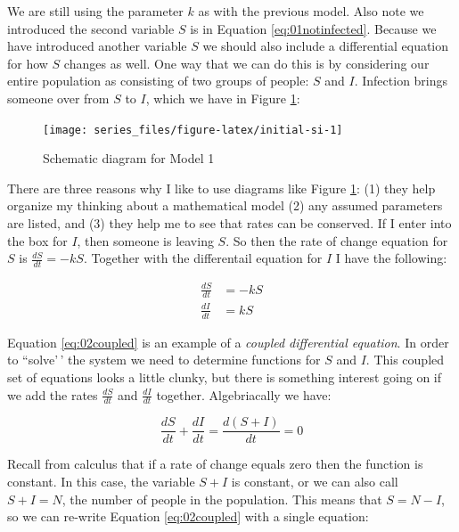 \documentclass[
]{book}
\theoremstyle{definition}
\theoremstyle{definition}
\theoremstyle{definition}
\theoremstyle{remark}
\begin{document}
We are still using the parameter \(k\) as with the previous model. Also note we introduced the second variable \(S\) is in Equation \eqref{eq:01notinfected}. Because we have introduced another variable \(S\) we should also include a differential equation for how \(S\) changes as well. One way that we can do this is by considering our entire population as consisting of two groups of people: \(S\) and \(I\). Infection brings someone over from \(S\) to \(I\), which we have in Figure \ref{fig:initial-si}:

\begin{figure}

{\centering \texttt{[image: series\_files/figure-latex/initial-si-1]} 

}

\caption{Schematic diagram for Model 1}\label{fig:initial-si}
\end{figure}

There are three reasons why I like to use diagrams like Figure \ref{fig:initial-si}: (1) they help organize my thinking about a mathematical model (2) any assumed parameters are listed, and (3) they help me to see that rates can be conserved. If I enter into the box for \(I\), then someone is leaving \(S\). So then the rate of change equation for \(S\) is \(\displaystyle \frac{dS}{dt} = -kS\). Together with the differentail equation for \(I\) I have the following:

\begin{equation}
\begin{split}
\frac{dS}{dt} &= -kS \\ 
\frac{dI}{dt} &= kS
\end{split}
\label{eq:02coupled}
\end{equation}

Equation \eqref{eq:02coupled} is an example of a \emph{coupled differential equation}. In order to ``solve'\,' the system we need to determine functions for \(S\) and \(I\). This coupled set of equations looks a little clunky, but there is something interest going on if we add the rates \(\displaystyle \frac{dS}{dt}\) and \(\displaystyle \frac{dI}{dt}\) together. Algebriacally we have:

\begin{equation} 
\frac{dS}{dt} +  \frac{dI}{dt} = \frac{d(S+I)}{dt} = 0
\end{equation}

Recall from calculus that if a rate of change equals zero then the function is constant. In this case, the variable \(S+I\) is constant, or we can also call \(S+I=N\), the number of people in the population. This means that \(S=N-I\), so we can re-write Equation \eqref{eq:02coupled} with a single equation:
\end{document}
